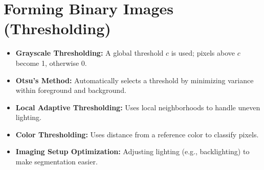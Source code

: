 \documentclass[12pt]{article}
\begin{document}
\section{Forming Binary Images (Thresholding)}
\begin{itemize}
    \item \textbf{Grayscale Thresholding:} A global threshold $c$ is used; pixels above $c$ become 1, otherwise 0.
    \item \textbf{Otsu’s Method:} Automatically selects a threshold by minimizing variance within foreground and background.
    \item \textbf{Local Adaptive Thresholding:} Uses local neighborhoods to handle uneven lighting.
    \item \textbf{Color Thresholding:} Uses distance from a reference color to classify pixels.
    \item \textbf{Imaging Setup Optimization:} Adjusting lighting (e.g., backlighting) to make segmentation easier.
\end{itemize}
\end{document}
